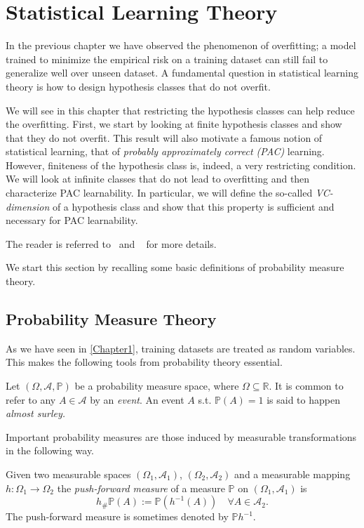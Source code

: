 \chapter{Statistical Learning Theory} %

\label{Chapter2} %
\setcounter{chapter}{2}
In the previous chapter we have observed the phenomenon of overfitting; a model
trained to minimize the empirical risk on a training dataset can still fail to generalize
well over unseen dataset. A fundamental question in statistical learning theory is how to design
hypothesis classes that do not overfit.  

We will see in this chapter that restricting the hypothesis classes can help
reduce the overfitting. First, we start by looking at finite hypothesis classes
and show that they do not overfit. This result will also motivate a famous
notion of statistical learning, that of \emph{probably approximately correct
(PAC)} learning. However, finiteness of the hypothesis class is, indeed, a very
restricting condition. We will look at infinite classes that do not lead to
overfitting and then characterize PAC learnability. In particular, we will
define the so-called \emph{VC-dimension} of a hypothesis class and show that
this property is sufficient and necessary for PAC learnability.

The reader is referred to~\cite{Shalev:ML:2014} and ~\cite{Shapire:ThML2019} for more details. 

We start this section by recalling some basic definitions of probability
measure theory.
\section{Probability Measure Theory}
As we have seen in \autoref{Chapter1}, training datasets are treated as random
variables. This makes the following tools from probability theory essential. 

Let $(\Omega,\mathcal{A}, \mathbb{P})$ be a probability measure space, where $\Omega \subseteq \mathbb{R}$. 
It is common to refer to any $A \in \mathcal{A}$ by an \emph{event}. An event
$A$ s.t. $\mathbb{P}(A)=1$ is said to happen \emph{almost surley.}

Important probability measures are those induced by measurable transformations in the following way. 
\begin{definition}
	Given two measurable spaces $(\Omega_1, \mathcal{A}_1)$, $(\Omega_2, \mathcal{A}_2)$ and a measurable mapping $h:\Omega_1 \to \Omega_2$ 
	the \emph{push-forward measure} of a measure $\mathbb{P}$ on $(\Omega_1, \mathcal{A}_1)$ is 
	$$
	h_\#\mathbb{P} (A) := \mathbb{P} (h^{-1}(A)) \quad  \forall A \in \mathcal{A}_2.
	$$
	The push-forward measure is sometimes denoted by $\mathbb{P} h^{-1}$.
\end{definition}

